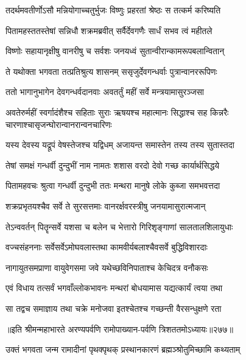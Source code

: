 \twolineshloka
{तदर्थमवतीर्णोऽसौ मन्नियोगाच्चतुर्भुजः}
{विष्णुः प्रहरतां श्रेष्ठः स तत्कर्म करिष्यति}



\twolineshloka
{पितामहस्ततस्तेषां सन्निधौ शक्रमब्रवीत्}
{सर्वैर्देवगणैः सार्धं सभव त्वं महीतले}


\twolineshloka
{विष्णोः सहायानृक्षीषु वानरीषु च सर्वशः}
{जनयध्वं सुतान्वीरान्कामरूपबलान्वितान्}


\twolineshloka
{ते यथोक्ता भगवता तत्प्रतिश्रुत्य शासनम्}
{ससृजुर्देवगन्धर्वाः पुत्रान्वानररूपिणः}


\twolineshloka
{ततो भागानुभागेन देवगन्धर्वदानवाः}
{अवतर्तुं महीं सर्वे मन्त्रयामासुरञ्जसा}


\threelineshloka
{अवतेरुर्महीं स्वर्गादंशैश्च सहिताः सुराः}
{ऋषयश्च महात्मानः सिद्धाश्च सह किन्नरैः}
{चारणाश्चासृजन्घोरान्वानरान्वनचारिणः}


\twolineshloka
{यस्य देवस्य यद्रूपं वेषस्तेजश्च यद्विधम्}
{अजायन्त समास्तेन तस्य तस्य सुतास्तदा}


\twolineshloka
{तेषां समक्षं गन्धर्वी दुन्दुभीं नाम नामतः}
{शशास वरदो देवो गच्छ कार्यार्थसिद्धये}


\twolineshloka
{पितामहवचः श्रुत्वा गन्धर्वी दुन्दुभी ततः}
{मन्थरा मानुषे लोके कुब्जा समभवत्तदा}


\twolineshloka
{शक्रप्रभृतयश्चैव सर्वे ते सुरसत्तमाः}
{वानरर्क्षवरस्त्रीषु जनयामासुरात्मजान्}


\twolineshloka
{तेऽन्ववर्तन् पितॄन्सर्वे यशसा च बलेन च}
{भेत्तारो गिरिशृङ्गाणां सालतालशिलायुधाः}


\twolineshloka
{वज्चसंहननाः सर्वेसर्वेऽमोघवलास्तथा}
{कामवीर्यबलाश्चैवसर्वे बुद्धिविशारदाः}


\twolineshloka
{नागायुतसमप्राणा वायुवेगसमा जवे}
{यथेच्छविनिपाताश्च केचिदत्र वनौकसः}


\twolineshloka
{एवं विधाय तत्सर्वं भगवाँल्लोकभावनः}
{मन्थरां बोधयामास यद्यत्कार्यं त्वया तथा}


\twolineshloka
{सा तद्वच समाज्ञाय तथा चक्रे मनोजवा}
{इतश्चेतश्च गच्छन्ती वैरसन्धुक्षणे रता}


॥इति श्रीमन्महाभारते अरण्यपर्वणि रामोपाख्यान-पर्वणि त्रिशततमोऽध्यायः॥२७७॥

\storymeta

\resetShloka


\twolineshloka
{उक्तं भगवता जन्म रामादीनां पृथक्पृथक्}
{प्रस्थानकारणं ब्रह्मञ्श्रोतुमिच्छामि कथ्यताम्}


